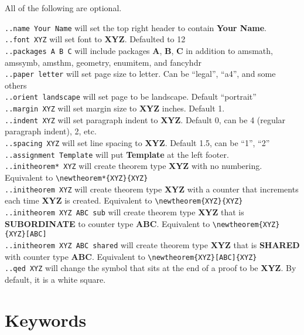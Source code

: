 \documentclass[12pt]{article}
\begin{document}
\begin{flushleft}
\bigskip
\bigskip

All of the following are optional.

\verb|..name Your Name| will set the top right header to contain \textbf{Your Name}. \\
\verb|..font XYZ| will set font to \textbf{XYZ}. Defaulted to 12 \\
\verb|..packages A B C| will include packages \textbf{A}, \textbf{B}, \textbf{C} in addition to amsmath, amssymb, amsthm, geometry, enumitem, and fancyhdr \\
\verb|..paper letter| will set page size to letter. Can be ``legal'', ``a4'', and some others\\
\verb|..orient landscape| will set page to be landscape. Default ``portrait''\\

\bigskip
\verb|..margin XYZ| will set margin size to \textbf{XYZ} inches. Default 1.\\
\verb|..indent XYZ| will set paragraph indent to \textbf{XYZ}. Default 0, can be 4 (regular paragraph indent), 2, etc. \\
\verb|..spacing XYZ| will set line spacing to \textbf{XYZ}. Default 1.5, can be ``1'', ``2''\\
\verb|..assignment Template| will put \textbf{Template} at the left footer. \\

\bigskip
\verb|..initheorem* XYZ| will create theorem type \textbf{XYZ} with no numbering. Equivalent to \verb|\newtheorem*{XYZ}{XYZ}|\\
\verb|..initheorem XYZ| will create theorem type \textbf{XYZ} with a counter that increments each time \textbf{XYZ} is created. Equivalent to \verb|\newtheorem{XYZ}{XYZ}|\\
\verb|..initheorem XYZ ABC sub| will create theorem type \textbf{XYZ} that is \textbf{SUBORDINATE} to counter type \textbf{ABC}. Equivalent to \verb|\newtheorem{XYZ}{XYZ}[ABC]|\\
\verb|..initheorem XYZ ABC shared| will create theorem type \textbf{XYZ} that is \textbf{SHARED} with counter type \textbf{ABC}. Equivalent to \verb|\newtheorem{XYZ}[ABC]{XYZ}|\\
\verb|..qed XYZ| will change the symbol that sits at the end of a proof to be \textbf{XYZ}. By default, it is a white square.

\newpage

\section*{Keywords}


\end{flushleft}
\end{document}
